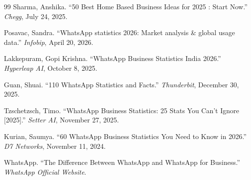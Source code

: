 \documentclass[12pt,a4paper]{report}
\begin{document}
\begin{thebibliography}{99}
Sharma, Anshika. ``50 Best Home Based Business Ideas for 2025 : Start Now.'' \textit{Chegg}, July 24, 2025.

Posavac, Sandra. ``WhatsApp statistics 2026: Market analysis \& global usage data.'' \textit{Infobip}, April 20, 2026.

Lakkepuram, Gopi Krishna. ``WhatsApp Business Statistics India 2026.'' \textit{Hyperleap AI}, October 8, 2025.

Guan, Shuai. ``110 WhatsApp Statistics and Facts.'' \textit{Thunderbit}, December 30, 2025.

Tzschetzsch, Timo. ``WhatsApp Business Statistics: 25 Stats You Can't Ignore [2025].'' \textit{Setter AI}, November 27, 2025.

Kurian, Saumya. ``60 WhatsApp Business Statistics You Need to Know in 2026.'' \textit{D7 Networks}, November 11, 2024.

WhatsApp. ``The Difference Between WhatsApp and WhatsApp for Business.'' \textit{WhatsApp Official Website}.


\end{thebibliography}



\end{document}
